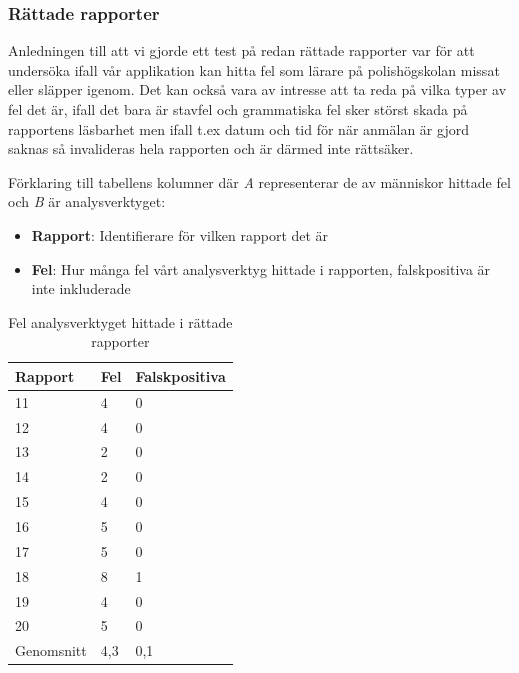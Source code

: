\documentclass[swedish]{maucsthesis}
\begin{document}
\subsubsection{Rättade rapporter}

Anledningen till att vi gjorde ett test på redan rättade rapporter var för att undersöka ifall vår applikation kan hitta fel som lärare på polishögskolan missat eller släpper igenom.
Det kan också vara av intresse att ta reda på vilka typer av fel det är, ifall det bara är stavfel och grammatiska fel sker störst skada på rapportens läsbarhet men ifall
t.ex datum och tid för när anmälan är gjord saknas så invalideras hela rapporten och är därmed inte rättsäker.

Förklaring till tabellens kolumner där \textit{A} representerar de av människor hittade fel och \textit{B} är analysverktyget:

\begin{itemize}
\item \textbf{Rapport}: Identifierare för vilken rapport det är
\item \textbf{Fel}: Hur många fel vårt analysverktyg hittade i rapporten, falskpositiva är inte inkluderade
\end{itemize}

\begin{table}[H]
\centering
\begin{tabular}{|l|l|l|}
\hline
Rapport    & Fel & Falskpositiva  \\ \hline
11          & 4   & 0             \\ \hline
12          & 4   & 0             \\ \hline
13          & 2   & 0             \\ \hline
14          & 2   & 0             \\ \hline
15          & 4   & 0             \\ \hline
16          & 5   & 0             \\ \hline
17          & 5   & 0             \\ \hline
18          & 8   & 1             \\ \hline
19          & 4   & 0             \\ \hline
20          & 5   & 0             \\ \hline
Genomsnitt  & 4,3 & 0,1            \\ \hline
\end{tabular}
\caption{Fel analysverktyget hittade i rättade rapporter}
\label{gradedtable}
\end{table}
\end{document}
